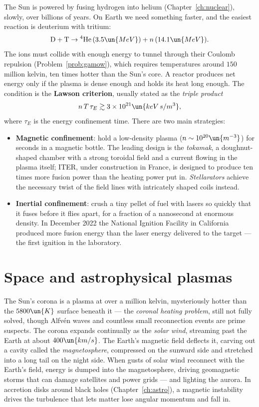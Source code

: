 The Sun is powered by fusing hydrogen into helium (Chapter~\ref{ch:nuclear}), slowly, over billions of years. On Earth we need something faster, and the easiest reaction is deuterium with tritium:
\[
  \mathrm{D} + \mathrm{T}\to{}^4\mathrm{He}\,(3.5\un{MeV}) + n\,(14.1\un{MeV}).
\]
The ions must collide with enough energy to tunnel through their Coulomb repulsion (Problem~\ref{prob:gamow}), which requires temperatures around $150$ million kelvin, ten times hotter than the Sun's core. A reactor produces net energy only if the plasma is dense enough and holds its heat long enough. The condition is the \textbf{Lawson criterion}, usually stated as the \emph{triple product}
\[
  n\,T\,\tau_E\gtrsim3\times10^{21}\un{keV\,s/m^3},
\]
where $\tau_E$ is the energy confinement time. There are two main strategies:
\begin{itemize}[itemsep=3pt]
  \item \textbf{Magnetic confinement}: hold a low-density plasma ($n\sim10^{20}\un{m^{-3}}$) for seconds in a magnetic bottle. The leading design is the \emph{tokamak}, a doughnut-shaped chamber with a strong toroidal field and a current flowing in the plasma itself; ITER, under construction in France, is designed to produce ten times more fusion power than the heating power put in. \emph{Stellarators} achieve the necessary twist of the field lines with intricately shaped coils instead.
  \item \textbf{Inertial confinement}: crush a tiny pellet of fuel with lasers so quickly that it fuses before it flies apart, for a fraction of a nanosecond at enormous density. In December 2022 the National Ignition Facility in California produced more fusion energy than the laser energy delivered to the target --- the first ignition in the laboratory.
\end{itemize}

\section{Space and astrophysical plasmas}

The Sun's corona is a plasma at over a million kelvin, mysteriously hotter than the $5800\un{K}$ surface beneath it --- the \emph{coronal heating problem}, still not fully solved, though Alfv\'en waves and countless small reconnection events are prime suspects. The corona expands continually as the \emph{solar wind}, streaming past the Earth at about $400\un{km/s}$. The Earth's magnetic field deflects it, carving out a cavity called the \emph{magnetosphere}, compressed on the sunward side and stretched into a long tail on the night side. When gusts of solar wind reconnect with the Earth's field, energy is dumped into the magnetosphere, driving geomagnetic storms that can damage satellites and power grids --- and lighting the aurora. In accretion disks around black holes (Chapter~\ref{ch:astro}), a magnetic instability drives the turbulence that lets matter lose angular momentum and fall in.

